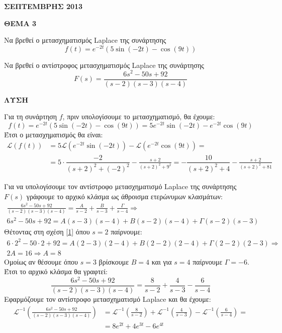\documentclass[twoside,nofonts,internet,shmeiwseis]{thewria}
\begin{document}
\begin{center}
{\large \textbf{ΣΕΠΤΕΜΒΡΗΣ 2013}}
\end{center}
\textbf{ΘΕΜΑ 3}
\begin{alist}
\item Να βρεθεί ο μετασχηματισμός Laplace της συνάρτησης
\[ f(t)=e^{-2t}\left(5\sin{(-2t)}-\cos{(9t)} \right)  \]
\item Να βρεθεί ο αντίστροφος μετασχηματισμός Laplace της συνάρτησης
\[ F(s)=\frac{6s^2-50s+92}{(s-2)(s-3)(s-4)} \]
\end{alist}
\textbf{ΛΥΣΗ}
\begin{alist}
\item Για τη συνάρτηση $ f $, πριν υπολογίσουμε το μετασχηματισμό, θα έχουμε:
\[ f(t)=e^{-2t}\left(5\sin{(-2t)}-\cos{(9t)} \right)=5e^{-2t}\sin{(-2t)}-e^{-2t}\cos{(9t)} \]
Έτσι ο μετασχηματισμός θα είναι:
\begin{align*}
\mathcal{L}(f(t))&=5\mathcal{L}\left(e^{-2t}\sin{(-2t)} \right)-\mathcal{L}\left( e^{-2t}\cos{(9t)}\right) =\\
&=5\cdot\dfrac{-2}{(s+2)^2+(-2)^2}-\frac{s+2}{(s+2)^2+9^2}=-\dfrac{10}{(s+2)^2+4}-\frac{s+2}{(s+2)^2+81}
\end{align*}
\item Για να υπολογίσουμε τον αντίστροφο μετασχηματισμό Laplace της συνάρτησης $ F(s) $ γράφουμε το αρχικό κλάσμα ως άθροισμα ετερώνυμων κλασμάτων:
\begin{gather}
\frac{6s^2-50s+92}{(s-2)(s-3)(s-4)}=\frac{A}{s-2}+\frac{B}{s-3}+\frac{\varGamma}{s-4}\Rightarrow\nonumber\\
6s^2-50s+92=A(s-3)(s-4)+B(s-2)(s-4)+\varGamma(s-2)(s-3)\label{1}
\end{gather}
Θέτοντας στη σχέση \eqref{1} όπου $ s=2 $ παίρνουμε:
\begin{gather*} 6\cdot2^2-50\cdot2+92=A(2-3)(2-4)+B(2-2)(2-4)+\varGamma(2-2)(2-3)\Rightarrow\\
2A=16\Rightarrow A=8
\end{gather*}
Ομοίως αν θέσουμε όπου $ s=3 $ βρίσκουμε $ B=4 $ και για $ s=4 $ παίρνουμε $ \varGamma=-6 $. Έτσι το αρχικό κλάσμα θα γραφτεί:
\[ \frac{6s^2-50s+92}{(s-2)(s-3)(s-4)}=\frac{8}{s-2}+\frac{4}{s-3}-\frac{6}{s-4} \]
Εφαρμόζουμε τον αντίστροφο μετασχηματισμό Laplace και θα έχουμε:
\begin{align*}
\mathcal{L}^{-1}\left( \frac{6s^2-50s+92}{(s-2)(s-3)(s-4)}\right) &=\mathcal{L}^{-1}\left( \frac{8}{s-2}\right) +\mathcal{L}^{-1}\left( \frac{4}{s-3}\right) -\mathcal{L}^{-1}\left( \frac{6}{s-4}\right)=\\
&=8e^{2t}+4e^{3t}-6e^{4t}
\end{align*}
\end{alist}
\end{document}
